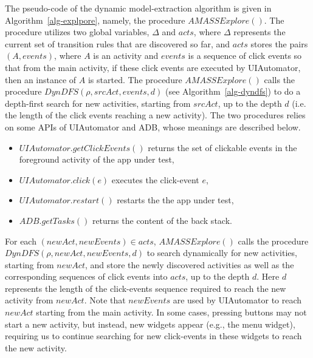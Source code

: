 The pseudo-code of the dynamic model-extraction algorithm is given in Algorithm~\ref{alg-explpore}, namely, the procedure $AMASSExplore()$.  
The procedure utilizes two global variables, $\Delta$ and $acts$, where $\Delta$ represents the current set of transition rules that are discovered so far, and $acts$ stores the pairs $(A, events)$, where $A$ is an activity and $events$ is a sequence of click events so that from the main activity, if these click events are executed by UIAutomator, then an instance of $A$ is started. The procedure $AMASSExplore()$ calls the procedure $DynDFS(\rho, srcAct, events, d)$ (see Algorithm~\ref{alg-dyndfs}) to do a depth-first search for new activities, starting from $srcAct$, up to the depth $d$ (i.e. the length of the click events reaching a new activity). The two procedures relies on some APIs of UIAutomator and ADB, whose meanings are described below.  
\begin{itemize}
\item $UIAutomator.getClickEvents()$ returns the set of clickable events in the foreground activity of the app under test,
\item $UIAutomator.click(e)$ executes the click-event $e$,
\item $UIAutomator.restart()$ restarts the the app under test,
\item $ADB.getTasks()$ returns the content of the back stack. 
\end{itemize}


For each $(newAct, newEvents) \in acts$, $AMASSExplore()$ calls the procedure $DynDFS(\rho, newAct, newEvents, d)$ to search dynamically for new activities, starting from $newAct$, and store the newly discovered activities as well as the corresponding sequences of click events into $acts$, up to the depth $d$. Here $d$ represents the length of the click-events sequence required to reach the new activity from $newAct$. Note that $newEvents$ are used by UIAutomator to reach $newAct$ starting from the main activity.  In some cases, pressing buttons may not start a new activity, but instead, new widgets appear (e.g., the menu widget), requiring us to continue searching for new click-events in these widgets to reach the new activity.

